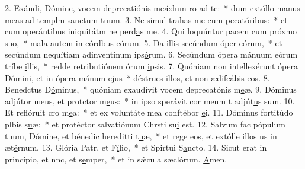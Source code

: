2. Exáudi, Dómine, vocem deprecatiónis meǽdum ro \uline{a}d te:~* dum extóllo manus meas ad templm sanctum t\uline{u}um.
3. Ne simul trahas me cum pccat\uline{ó}ribus:~* et cum operántibus iniquitátm ne perd\uline{a}s me.
4. Qui loquúntur pacem cum próxmo s\uline{u}o,~* mala autem in córdbus e\uline{ó}rum.
5. Da illis secúndum óper e\uline{ó}rum,~* et secúndum nequítiam adinventinum ips\uline{ó}rum.
6. Secúndum ópera mánuum eórum tríbe \uline{i}llis,~* redde retributiónem órum \uline{i}psis.
7. Quóniam non intellexérunt ópera Dómini, et in ópera mánum \uline{e}jus~* déstrues illos, et non ædifcábis \uline{e}os.
8. Benedctus D\uline{ó}minus,~* quóniam exaudívit vocem deprecatónis m\uline{e}æ.
9. Dóminus adjútor meus, et protctor m\uline{e}us:~* in ipso sperávit cor meum t adjút\uline{u}s sum.
10. Et reflóruit cro m\uline{e}a:~* et ex voluntáte mea conftébor \uline{e}i.
11. Dóminus fortitúdo plbis s\uline{u}æ:~* et protéctor salvatiónum Chrsti su\uline{i} est.
12. Salvum fac pópulum tuum, Dómine, et bénedic hereditti t\uline{u}æ,~* et rege eos, et extólle illos us in æt\uline{é}rnum.
13. Glória Patr, et F\uline{í}lio,~* et Spirtui S\uline{a}ncto.
14. Sicut erat in princípio, et nnc, et s\uline{e}mper,~* et in sǽcula sæclórum. \uline{A}men.
